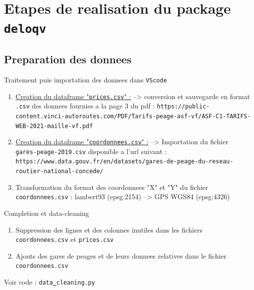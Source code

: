 \documentclass{beamer}
\begin{document}
\section{Etapes de realisation du package \texttt{deloqv}}

\subsection{Preparation des donnees}
\begin{frame}{Traitement puis importation des donnees dans \texttt{VScode}}
\begin{enumerate}
    \item \underline{Creation du dataframe "\texttt{prices.csv}" :} \newline --> conversion et sauvegarde en format \texttt{.csv} des donnees fournies a la page 3 du pdf : \texttt{https://public-content.vinci-autoroutes.com/PDF/\newline Tarifs-peage-asf-vf/ASF-C1-TARIFS-WEB-2021-maille-\newline vf.pdf}
    \item \underline{Creation du dataframe "\texttt{coordonnees.csv}" :} \newline --> Importation du fichier \texttt{gares-peage-2019.csv} disponible a l'url suivant : \texttt{https://www.data.gouv.fr/en/datasets/gares-de-\newline peage-du-reseau-routier-national-concede/}
    \item Transformation du format des coordonnees "X" et "Y" du fichier \texttt{coordonnees.csv} : \newline
    lambert93 (epsg:2154) --> GPS WGS84 (epsg:4326)
\end{enumerate}
\end{frame}

\begin{frame}{Completion et data-cleaning} 
\begin{enumerate}
    \item Suppression des lignes et des colonnes inutiles dans les fichiers \texttt{coordonnees.csv} et \texttt{prices.csv} 
    \item Ajouts des gares de peages et de leurs donnees relatives dans le fichier \texttt{coordonnees.csv}\newline
\newline\newline
\end{enumerate}
Voir code : \texttt{data\underline{ }cleaning.py}
\end{frame}
\end{document}
